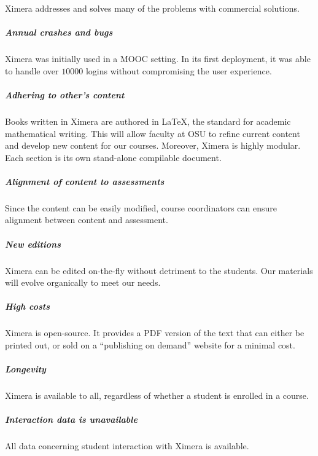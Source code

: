\documentclass{ximera}
\begin{document}
\newpage


Ximera addresses and solves many of the problems with commercial
solutions.

\subparagraph{Annual crashes and bugs}

Ximera was initially used in a MOOC setting. In its first deployment,
it was able to handle over $10000$ logins without compromising the
user experience.


\subparagraph{Adhering to other's content}

Books written in Ximera are authored in \LaTeX, the standard for
academic mathematical writing. This will allow faculty at OSU to
refine current content and develop new content for our
courses. Moreover, Ximera is highly modular. Each section is its own
stand-alone compilable document.


\subparagraph{Alignment of content to assessments}

Since the content can be easily modified, course coordinators can
ensure alignment between content and assessment.


\subparagraph{New editions}

Ximera can be edited on-the-fly without detriment to the students. Our
materials will evolve organically to meet our needs.




\subparagraph{High costs}

Ximera is open-source. It provides a PDF version of the text that can
either be printed out, or sold on a ``publishing on demand'' website
for a minimal cost.


\subparagraph{Longevity}
Ximera is available to all, regardless of whether a student is
enrolled in a course.



\subparagraph{Interaction data is unavailable}

All data concerning student interaction with Ximera is available.
\end{document}
